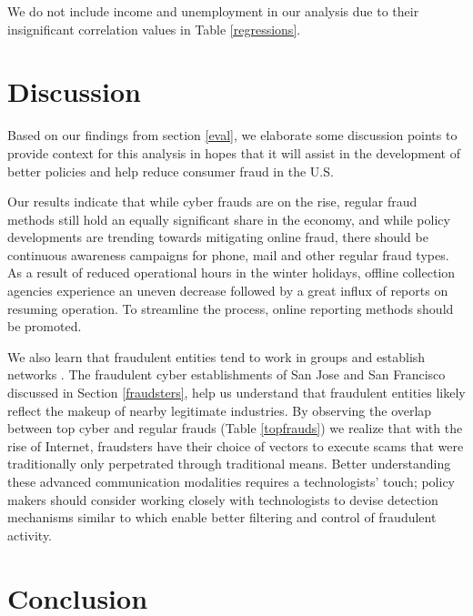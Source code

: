 \documentclass[conference]{IEEEtran}
\begin{document}
We do not include income and unemployment in our analysis due to their insignificant correlation values in Table \ref{regressions}.

\section{Discussion}\label{discussion}
Based on our findings from section \ref{eval}, we elaborate some discussion points to provide context for this analysis in hopes that it will assist in the development of better policies and help reduce consumer fraud in the U.S. 

Our results indicate that while cyber frauds are on the rise, regular fraud methods still hold an equally significant share in the economy, and while policy developments are trending towards mitigating online fraud, there should be continuous awareness campaigns for phone, mail and other regular fraud types. As a result of reduced operational hours in the winter holidays, offline collection agencies experience an uneven decrease followed by a great influx of reports on resuming operation. To streamline the process, online reporting methods should be promoted.

We also learn that fraudulent entities tend to work in groups and establish networks \cite{buffalodebt2}. The fraudulent cyber establishments of San Jose and San Francisco discussed in Section \ref{fraudsters}, help us understand that fraudulent entities likely reflect the makeup of nearby  legitimate industries.  
By observing the overlap between top cyber and regular frauds (Table \ref{topfrauds}) we realize that with the rise of Internet, fraudsters have their choice of vectors to execute scams  that were traditionally only perpetrated through traditional means. Better understanding these advanced communication  modalities requires a technologists' touch;  policy makers should consider working closely with technologists to devise detection mechanisms similar to \cite{brause1999neural, moreau1997detection} which enable better filtering and control of fraudulent activity.

\section{Conclusion}\label{conclusion}
\end{document}

